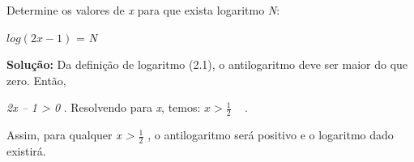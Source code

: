 \begin{texemplo}
    Determine os valores de \textit{x} para que exista logaritmo \textit{N}:

    \begin{Center}
        \( log \left( 2x-1 \right)  \)  = \textit{N}
    \end{Center}

\textbf{Solução:} Da definição de logaritmo (2.1), o antilogaritmo deve ser maior do que zero. Então,

\textit{2x – 1 > 0} . Resolvendo para \textit{x}, temos:  \( x>\frac{1}{2} \) ~ .

Assim, para qualquer \textit{x > $\frac{1}{2}$} , o antilogaritmo será positivo e o logaritmo dado existirá.

\end{texemplo}

